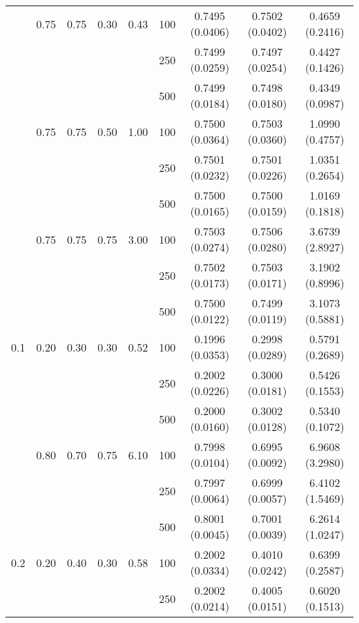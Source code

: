 \begin{small}
\begin{landscape}
\begin{longtable}{ccccccccc}
    &   0.75    &   0.75    &   0.30    &   0.43    &   100 &   0.7495 (0.0406) &   0.7502 (0.0402) &   0.4659 (0.2416) \\
    &       &       &       &       &   250 &   0.7499 (0.0259) &   0.7497 (0.0254) &   0.4427 (0.1426) \\
    &       &       &       &       &   500 &   0.7499 (0.0184) &   0.7498 (0.0180) &   0.4349 (0.0987) \\
    &   0.75    &   0.75    &   0.50    &   1.00    &   100 &   0.7500 (0.0364) &   0.7503 (0.0360) &   1.0990 (0.4757) \\
    &       &       &       &       &   250 &   0.7501 (0.0232) &   0.7501 (0.0226) &   1.0351 (0.2654) \\
    &       &       &       &       &   500 &   0.7500 (0.0165) &   0.7500 (0.0159) &   1.0169 (0.1818) \\
    &   0.75    &   0.75    &   0.75    &   3.00    &   100 &   0.7503 (0.0274) &   0.7506 (0.0280) &   3.6739 (2.8927) \\
    &       &       &       &       &   250 &   0.7502 (0.0173) &   0.7503 (0.0171) &   3.1902 (0.8996) \\
    &       &       &       &       &   500 &   0.7500 (0.0122) &   0.7499 (0.0119) &   3.1073 (0.5881) \\\midrule
0.1 &   0.20    &   0.30    &   0.30    &   0.52    &   100 &   0.1996 (0.0353) &   0.2998 (0.0289) &   0.5791 (0.2689) \\
    &       &       &       &       &   250 &   0.2002 (0.0226) &   0.3000 (0.0181) &   0.5426 (0.1553) \\
    &       &       &       &       &   500 &   0.2000 (0.0160) &   0.3002 (0.0128) &   0.5340 (0.1072) \\
    &   0.80    &   0.70    &   0.75    &   6.10    &   100 &   0.7998 (0.0104) &   0.6995 (0.0092) &   6.9608 (3.2980) \\
    &       &       &       &       &   250 &   0.7997 (0.0064) &   0.6999 (0.0057) &   6.4102 (1.5469) \\
    &       &       &       &       &   500 &   0.8001 (0.0045) &   0.7001 (0.0039) &   6.2614 (1.0247) \\\midrule
0.2 &   0.20    &   0.40    &   0.30    &   0.58    &   100 &   0.2002 (0.0334) &   0.4010 (0.0242) &   0.6399 (0.2587) \\
    &       &       &       &       &   250 &   0.2002 (0.0214) &   0.4005 (0.0151) &   0.6020 (0.1513) \\

\end{longtable}
\end{landscape}
\end{small}
